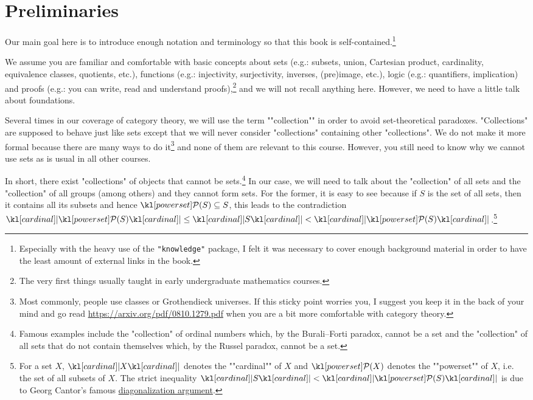\documentclass[main.tex]{subfiles}
\begin{document}
\chapter{Preliminaries}\label{chap:prelim}
Our main goal here is to introduce enough notation and terminology so that this book is self-contained.\footnote{Especially with the heavy use of the \texttt{"knowledge"} package, I felt it was necessary to cover enough background material in order to have the least amount of external links in the book.}

We assume you are familiar and comfortable with basic concepts about sets (e.g.: subsets, union, Cartesian product, cardinality, equivalence classes, quotients, etc.), functions (e.g.: injectivity, surjectivity, inverses, (pre)image, etc.), logic (e.g.: quantifiers, implication) and proofs (e.g.: you can write, read and understand proofs),\footnote{The very first things usually taught in early undergraduate mathematics courses.} and we will not recall anything here. However, we need to have a little talk about foundations.

\AP Several times in our coverage of category theory, we will use the term ""collection"" in order to avoid set-theoretical paradoxes. "Collections" are supposed to behave just like sets except that we will never consider "collections" containing other "collections". We do not make it more formal because there are many ways to do it\footnote{Most commonly, people use classes or Grothendieck universes. If this sticky point worries you, I suggest you keep it in the back of your mind and go read \url{https://arxiv.org/pdf/0810.1279.pdf} when you are a bit more comfortable with category theory.} and none of them are relevant to this course. However, you still need to know why we cannot use sets as is usual in all other courses.

In short, there exist "collections" of objects that cannot be sets.\footnote{Famous examples include the "collection" of ordinal numbers which, by the Burali--Forti paradox, cannot be a set and the "collection" of all sets that do not contain themselves which, by the Russel paradox, cannot be a set.} In our case, we will need to talk about the "collection" of all sets and the "collection" of all groups (among others) and they cannot form sets. For the former, it is easy to see because if $S$ is the set of all sets, then it contains all its subsets and hence $\mP(S) \subseteq S$, this leads to the contradiction $\cardinal{\mP(S)} \leq \cardinal{S} < \cardinal{\mP(S)}$.\footnote{\AP For a set $X$, $\cardinal{X}$ denotes the ""cardinal"" of $X$ and $\mP(X)$ denotes the ""powerset"" of $X$, i.e. the set of all subsets of $X$. The strict inequality $\cardinal{S} < \cardinal{\mP(S)}$ is due to Georg Cantor's famous \href{https://en.wikipedia.org/wiki/Cantor's_diagonal_argument}{diagonalization argument}.}
\end{document}
